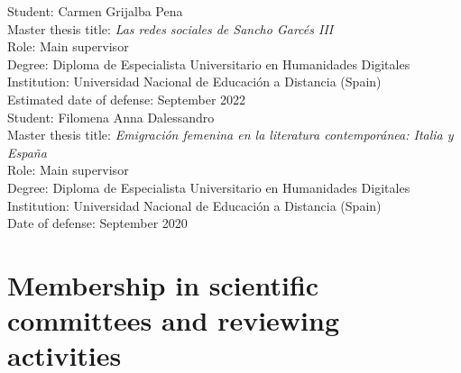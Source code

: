 \documentclass[11pt, a4paper]{article}
\newcommand{\ind}[1]{\textcolor{black!62!white}{\selectfont#1}}
\begin{document}
\ind{Student:} Carmen Grijalba Pena\\
\ind{Master thesis title:} \textit{Las redes sociales de Sancho Garcés III}\\
\ind{Role:} Main supervisor\\
\ind{Degree:} Diploma de Especialista Universitario en Humanidades Digitales\\
\ind{Institution:} Universidad Nacional de Educación a Distancia (Spain)\\
\ind{Estimated date of defense:} September 2022\\


\ind{Student:} Filomena Anna Dalessandro\\
\ind{Master thesis title:} \textit{Emigración femenina en la literatura contemporánea: Italia y España}\\
\ind{Role:} Main supervisor\\
\ind{Degree:} Diploma de Especialista Universitario en Humanidades Digitales\\
\ind{Institution:} Universidad Nacional de Educación a Distancia (Spain)\\
\ind{Date of defense:} September 2020

\section{Membership in scientific committees and reviewing activities}
\end{document}
